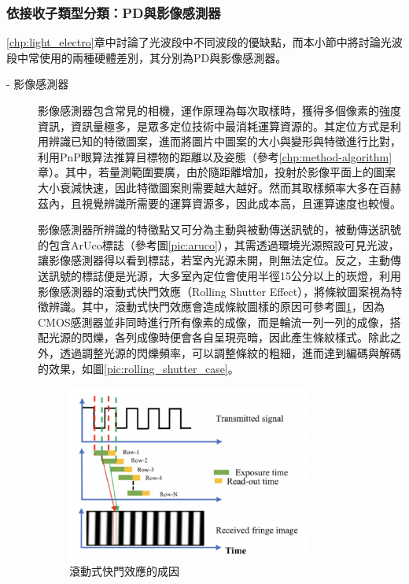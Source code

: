             \subsubsection{依接收子類型分類：PD與影像感測器}
            \label{chp:light_receiver}

                

                \ref{chp:light_electro}章中討論了光波段中不同波段的優缺點，而本小節中將討論光波段中常使用的兩種硬體差別，其分別為PD與影像感測器。

                \begin{description}

                    \item[- 影像感測器]\hfill 
                    
                    \qquad
                    影像感測器包含常見的相機，運作原理為每次取樣時，獲得多個像素的強度資訊，資訊量極多，是眾多定位技術中最消耗運算資源的。其定位方式是利用辨識已知的特徵圖案，進而將圖片中圖案的大小與變形與特徵進行比對，利用PnP眼算法推算目標物的距離以及姿態（參考\ref{chp:method-algorithm}章）。其中，若量測範圍要廣，由於隨距離增加，投射於影像平面上的圖案大小衰減快速，因此特徵圖案則需要越大越好。然而其取樣頻率大多在百赫茲內，且視覺辨識所需要的運算資源多，因此成本高，且運算速度也較慢。

                    \qquad
                    影像感測器所辨識的特徵點又可分為主動與被動傳送訊號的，被動傳送訊號的包含ArUco標誌（參考圖\ref{pic:aruco}），其需透過環境光源照設可見光波，讓影像感測器得以看到標誌，若室內光源未開，則無法定位。反之，主動傳送訊號的標誌便是光源，大多室內定位會使用半徑15公分以上的崁燈，利用影像感測器的滾動式快門效應（Rolling Shutter Effect），將條紋圖案視為特徵辨識。其中，滾動式快門效應會造成條紋圖樣的原因可參考圖\ref{pic:rolling_shutter}，因為CMOS感測器並非同時進行所有像素的成像，而是輪流一列一列的成像，搭配光源的閃爍，各列成像時便會各自呈現亮暗，因此產生條紋樣式。除此之外，透過調整光源的閃爍頻率，可以調整條紋的粗細，進而達到編碼與解碼的效果，如圖\ref{pic:rolling_shutter_case}。

                    \begin{figure}[htpb]
                        \centering
                        \includegraphics[width=8cm]{ch2pic/rolling_shutter.png}
                        \caption{滾動式快門效應的成因\cite{pic:rolling_shutter}}
                        \label{pic:rolling_shutter}
                    \end{figure}


\end{description}
